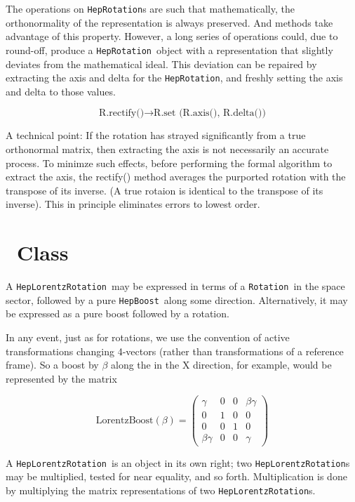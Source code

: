 \documentclass[twoside,12pt]{article}
\def \Ro {{\tt HepRotation}}
\def \Rotation {{\tt Rotation}}
\def \LT {{\tt HepLorentzRotation}}
\def \LB {{\tt HepBoost}}
\begin{document}
The operations on \Ro s are such that mathematically, the orthonormality of 
the representation is always preserved.  And methods take advantage of this 
property. 
However, a long series of operations could, due to round-off, produce a 
\Ro\ object with a representation that slightly deviates from the  
mathematical
ideal.  This deviation can be repaired by extracting the axis and delta
for the \Ro, and freshly setting the axis and delta to those values.

\begin{equation}
\label{eq:rectRot}
\mbox{R.rectify()} \rightarrow \mbox{R.set (R.axis(), R.delta())}
\end{equation}

A technical point:  If the rotation has strayed significantly from a true
orthonormal matrix, then extracting the axis is not necessarily an accurate
process.  To minimze such effects, before performing the formal algorithm
to extract the axis, the rectify() method averages the purported rotation 
with the transpose of its inverse.  (A true rotaion is identical to the 
transpose of its inverse).  This in principle eliminates errors to lowest 
order.


\section{\protect\LT\ Class}

A \LT\ may be
expressed in terms of a \Rotation\ in the space sector, followed by
a pure \LB\ along some direction.
Alternatively, it may be expressed as a pure boost followed by a rotation.

In any event, just as for rotations,
we use the convention of active transformations changing 4-vectors
(rather than transformations of a reference frame).  So a boost by
$\beta$ along the in the X direction, for example, would be represented by
the matrix

\begin{equation}
\label{eq:boostx}
  \mbox{LorentzBoost}(\beta) =
\left(
\begin{array}{cccc}
 \gamma & 0 & 0 & \beta \gamma \\
 0 & 1 & 0 & 0 \\
 0 & 0 & 1 & 0 \\
 \beta \gamma & 0 & 0 & \gamma
\end{array}
\right)
\end{equation}

A \LT\ is an object in its own right; two \LT s may be multiplied,
tested for near equality, and so forth.
Multiplication is done by multiplying the matrix representations of two
\LT s.
\end{document}

